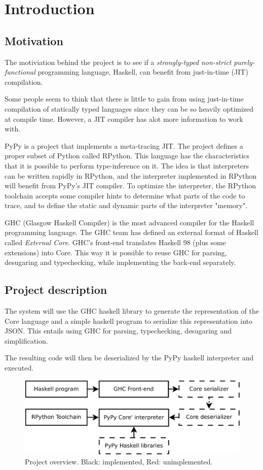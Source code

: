 
\section{Introduction}

\subsection{Motivation}

The motiviation behind the project is to see if a \emph{strongly-typed} 
\emph{non-strict} \emph{purely-functional} programming language, Haskell, 
can benefit from just-in-time (JIT) compilation.

Some people seem to think that there is little to gain from using 
just-in-time compilation of statically typed languages since they can be
so heavily optimized at compile time. However, a JIT compiler has alot
more information to work with.

PyPy is a project that implements a meta-tracing JIT. The project
defines a proper subset of Python called RPython. This language has 
the characteristics that it is possible to perform type-inference on it.
The idea is that interpreters can be written rapidly in RPython, and the
interpreter implemented in RPython will benefit from PyPy's JIT compiler.
To optimize the interpreter, the RPython toolchain accepts some compiler
hints to determine what parts of the code to trace, and to define the 
static and dynamic parts of the interpreter "memory".

GHC (Glasgow Haskell Compiler) is the most advanced compiler for the
Haskell programming language. The GHC team has defined an external format
of Haskell called \emph{External Core}. GHC's front-end translates
Haskell 98 (plus some extensions) into Core. This way it is possible to
reuse GHC for parsing, desugaring and typechecking, while implementing
the back-end separately. \cite{tolmach2010ghc}

\subsection{Project description}

The system will use the GHC haskell library to generate the 
representation of the Core language and a simple haskell program to 
serialize this representation into JSON. This entails using GHC for
parsing, typechecking, desugaring and simplification.

The resulting code will then be deserialized by the PyPy haskell interpreter 
and executed. 

\begin{figure}
\includegraphics[width=\textwidth]{diags/overview.pdf}
\caption{Project overview. Black: implemented, Red: unimplemented.}
\end{figure}


